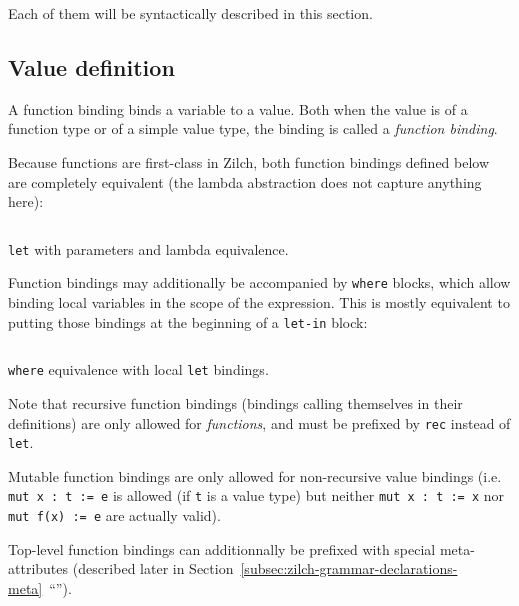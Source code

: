 \noindent Each of them will be syntactically described in this section.

\subsection{Value definition}\label{subsec:zilch-grammar-declarations-value}

A function binding binds a variable to a value.
Both when the value is of a function type or of a simple value type, the binding is called a \textit{function binding}.
\vspace*{\baselineskip}

Because functions are first-class in Zilch, both function bindings defined below are completely equivalent (the lambda abstraction does not capture anything here):

\begin{listing}[H]
	\inputminted{\zilchlexer}{examples/function-value-equivalence.zc}

	\captionsetup{style=invisible}
	\caption{\texttt{let} with parameters and lambda equivalence.}
\end{listing}
\vspace*{-\baselineskip}

Function bindings may additionally be accompanied by \verb|where| blocks, which allow binding local variables in the scope of the expression.
This is mostly equivalent to putting those bindings at the beginning of a \verb|let-in| block:

\begin{listing}[H]
	\inputminted{\zilchlexer}{examples/function-where-let-equivalence.zc}

	\captionsetup{style=invisible}
	\caption{\texttt{where} equivalence with local \texttt{let} bindings.}
\end{listing}
\vspace*{-\baselineskip}

Note that recursive function bindings (bindings calling themselves in their definitions) are only allowed for \textit{functions}, and must be prefixed by \verb|rec| instead of \verb|let|.

Mutable function bindings are only allowed for non-recursive value bindings (i.e. \texttt{mut x : t := e} is allowed (if \verb|t| is a value type) but neither \texttt{mut x : t := x} nor \texttt{mut f(x) := e} are actually valid).

Top-level function bindings can additionnally be prefixed with special meta-attributes (described later in Section~\ref{subsec:zilch-grammar-declarations-meta}~``'').

